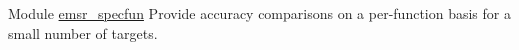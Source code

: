 
\begin{DoxyRefList}
\item[Module \mbox{\hyperlink{group__emsr__specfun}{emsr\+\_\+specfun}} ]\label{todo__todo000001}%
%
Provide accuracy comparisons on a per-\/function basis for a small number of targets.
\end{DoxyRefList}
